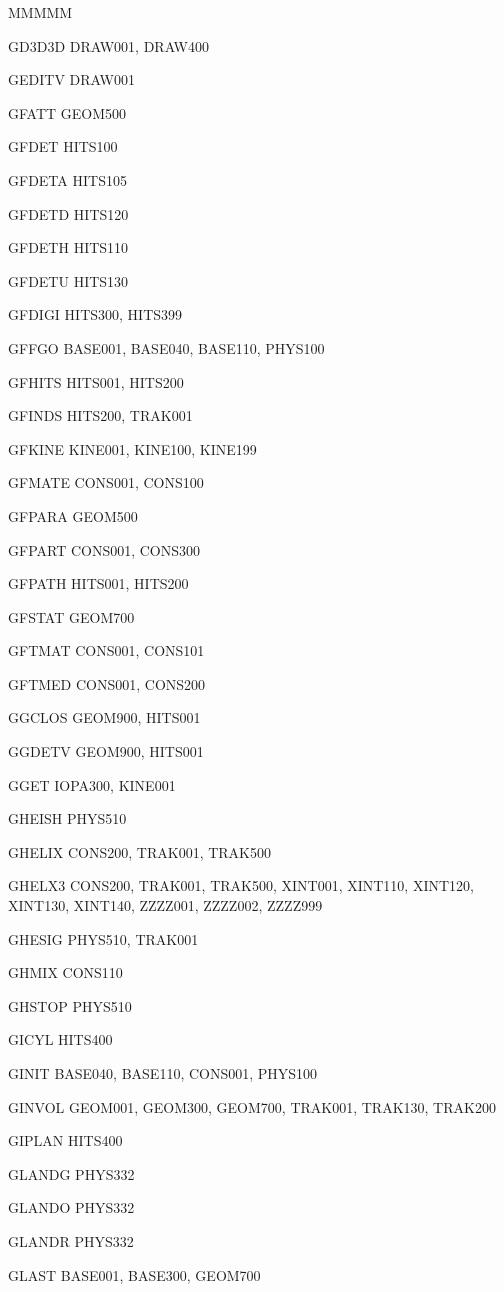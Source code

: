 {\begin{DL}{MMMMM}
\item[GD3D3D]DRAW001, DRAW400
\item[GEDITV]DRAW001
\item[GFATT ]GEOM500
\item[GFDET ]HITS100
\item[GFDETA]HITS105
\item[GFDETD]HITS120
\item[GFDETH]HITS110
\item[GFDETU]HITS130
\item[GFDIGI]HITS300, HITS399
\item[GFFGO ]BASE001, BASE040, BASE110, PHYS100
\item[GFHITS]HITS001, HITS200
\item[GFINDS]HITS200, TRAK001
\item[GFKINE]KINE001, KINE100, KINE199
\item[GFMATE]CONS001, CONS100
\item[GFPARA]GEOM500
\item[GFPART]CONS001, CONS300
\item[GFPATH]HITS001, HITS200
\item[GFSTAT]GEOM700
\item[GFTMAT]CONS001, CONS101
\item[GFTMED]CONS001, CONS200
\item[GGCLOS]GEOM900, HITS001
\item[GGDETV]GEOM900, HITS001
\item[GGET  ]IOPA300, KINE001
\item[GHEISH]PHYS510
\item[GHELIX]CONS200, TRAK001, TRAK500
\item[GHELX3]CONS200, TRAK001, TRAK500, XINT001, XINT110, XINT120,\\
XINT130, XINT140, ZZZZ001, ZZZZ002, ZZZZ999
\item[GHESIG]PHYS510, TRAK001
\item[GHMIX ]CONS110
\item[GHSTOP]PHYS510
\item[GICYL ]HITS400
\item[GINIT ]BASE040, BASE110, CONS001, PHYS100
\item[GINVOL]GEOM001, GEOM300, GEOM700, TRAK001, TRAK130, TRAK200
\item[GIPLAN]HITS400
\item[GLANDG]PHYS332
\item[GLANDO]PHYS332
\item[GLANDR]PHYS332
\item[GLAST] BASE001, BASE300, GEOM700

\end{DL}}
